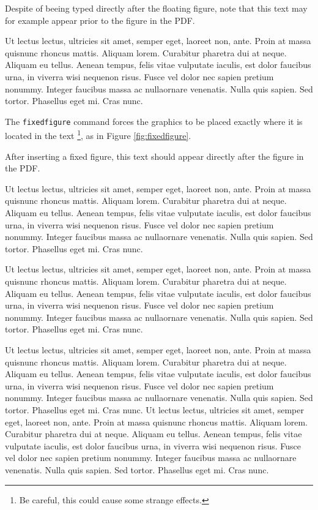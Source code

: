 \label{fig:floatingfigure}

Despite of beeing typed directly after the floating figure, note that this text may for example appear prior to the figure in the PDF.

Ut lectus lectus, ultricies sit amet, semper eget, laoreet non, ante. Proin at massa quisnunc rhoncus mattis. Aliquam lorem. Curabitur pharetra dui at neque. Aliquam eu tellus. Aenean tempus, felis vitae vulputate iaculis, est dolor faucibus urna, in viverra wisi nequenon risus. Fusce vel dolor nec sapien pretium nonummy. Integer faucibus massa ac nullaornare venenatis. Nulla quis sapien. Sed tortor. Phasellus eget mi. Cras nunc.

The \texttt{fixedfigure} command forces the graphics to be placed exactly where it is located in the text
\footnote{Be careful, this could cause some strange effects.}, 
as in Figure \ref{fig:fixedfigure}.

\label{fig:fixedfigure}

After inserting a fixed figure, this text should appear directly after the figure in the PDF.

Ut lectus lectus, ultricies sit amet, semper eget, laoreet non, ante. Proin at massa quisnunc rhoncus mattis. Aliquam lorem. Curabitur pharetra dui at neque. Aliquam eu tellus. Aenean tempus, felis vitae vulputate iaculis, est dolor faucibus urna, in viverra wisi nequenon risus. Fusce vel dolor nec sapien pretium nonummy. Integer faucibus massa ac nullaornare venenatis. Nulla quis sapien. Sed tortor. Phasellus eget mi. Cras nunc.

Ut lectus lectus, ultricies sit amet, semper eget, laoreet non, ante. Proin at massa quisnunc rhoncus mattis. Aliquam lorem. Curabitur pharetra dui at neque. Aliquam eu tellus. Aenean tempus, felis vitae vulputate iaculis, est dolor faucibus urna, in viverra wisi nequenon risus. Fusce vel dolor nec sapien pretium nonummy. Integer faucibus massa ac nullaornare venenatis. Nulla quis sapien. Sed tortor. Phasellus eget mi. Cras nunc.

Ut lectus lectus, ultricies sit amet, semper eget, laoreet non, ante. Proin at massa quisnunc rhoncus mattis. Aliquam lorem. Curabitur pharetra dui at neque. Aliquam eu tellus. Aenean tempus, felis vitae vulputate iaculis, est dolor faucibus urna, in viverra wisi nequenon risus. Fusce vel dolor nec sapien pretium nonummy. Integer faucibus massa ac nullaornare venenatis. Nulla quis sapien. Sed tortor. Phasellus eget mi. Cras nunc.
Ut lectus lectus, ultricies sit amet, semper eget, laoreet non, ante. Proin at massa quisnunc rhoncus mattis. Aliquam lorem. Curabitur pharetra dui at neque. Aliquam eu tellus. Aenean tempus, felis vitae vulputate iaculis, est dolor faucibus urna, in viverra wisi nequenon risus. Fusce vel dolor nec sapien pretium nonummy. Integer faucibus massa ac nullaornare venenatis. Nulla quis sapien. Sed tortor. Phasellus eget mi. Cras nunc.

